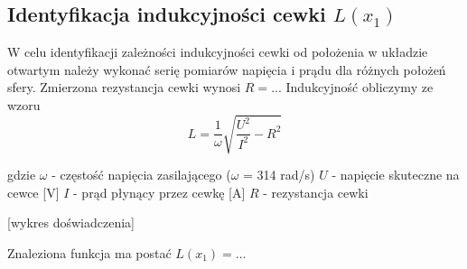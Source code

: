 \subsection{Identyfikacja indukcyjności cewki $L(x_1)$}

W celu identyfikacji zależności indukcyjności cewki od położenia w układzie otwartym należy wykonać serię pomiarów napięcia i prądu dla różnych położeń sfery. Zmierzona rezystancja cewki wynosi $R = ..$. Indukcyjność obliczymy ze wzoru
\begin{equation}
L = \dfrac{1}{\omega}\sqrt{\dfrac{U^2}{I^2} - R^2}
\end{equation}

gdzie
$\omega$ - częstość napięcia zasilającego ($\omega$ = 314 rad/s)
$U$ - napięcie skuteczne na cewce [V]
$I$ - prąd płynący przez cewkę [A]
$R$ - rezystancja cewki

[wykres doświadczenia]

Znaleziona funkcja ma postać
$L(x_1) = ...$




